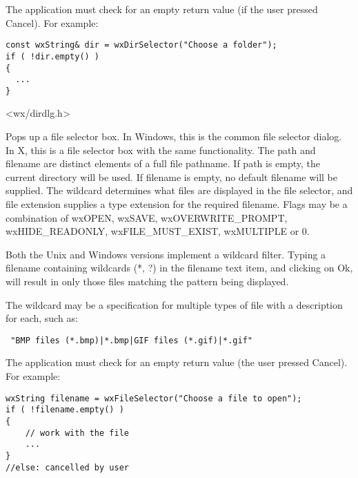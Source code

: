 The application must check for an empty return value (if the user pressed
Cancel). For example:

\begin{verbatim}
const wxString& dir = wxDirSelector("Choose a folder");
if ( !dir.empty() )
{
  ...
}
\end{verbatim}


<wx/dirdlg.h>

\label{wxfileselector}


Pops up a file selector box. In Windows, this is the common file selector
dialog. In X, this is a file selector box with the same functionality.
The path and filename are distinct elements of a full file pathname.
If path is empty, the current directory will be used. If filename is empty,
no default filename will be supplied. The wildcard determines what files
are displayed in the file selector, and file extension supplies a type
extension for the required filename. Flags may be a combination of wxOPEN,
wxSAVE, wxOVERWRITE\_PROMPT, wxHIDE\_READONLY, wxFILE\_MUST\_EXIST, wxMULTIPLE or 0.

Both the Unix and Windows versions implement a wildcard filter. Typing a
filename containing wildcards (*, ?) in the filename text item, and
clicking on Ok, will result in only those files matching the pattern being
displayed.

The wildcard may be a specification for multiple types of file
with a description for each, such as:

\begin{verbatim}
 "BMP files (*.bmp)|*.bmp|GIF files (*.gif)|*.gif"
\end{verbatim}

The application must check for an empty return value (the user pressed
Cancel). For example:

\begin{verbatim}
wxString filename = wxFileSelector("Choose a file to open");
if ( !filename.empty() )
{
    // work with the file
    ...
}
//else: cancelled by user
\end{verbatim}

